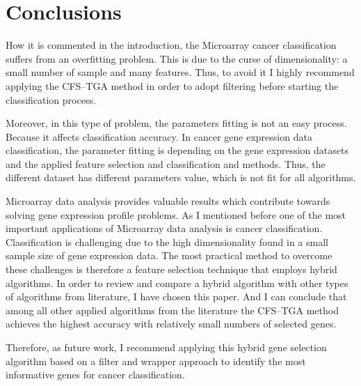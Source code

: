\documentclass[runningheads]{llncs}
\begin{document}
\section{Conclusions}
How it is commented in the introduction, the Microarray cancer classification suffers from an overfitting problem. This is due to the curse of dimensionality: a small number of sample and many features. Thus, to avoid it I highly recommend applying the CFS–TGA method in order to adopt filtering before starting the classification process.

Moreover, in this type of problem, the parameters fitting is not an easy process. Because it affects classification accuracy. In cancer gene expression data classification, the parameter fitting is depending on the gene expression datasets and the applied feature selection and classification and methods. Thus, the different dataset has different parameters value, which is not fit for all algorithms. 

Microarray data analysis provides valuable results which contribute towards solving gene expression profile problems. As I mentioned before one of the most important applications of Microarray data analysis is cancer classification. Classification is challenging due to the high dimensionality found in a small sample size of gene expression data. The most practical method to overcome these challenges is therefore a feature selection technique that employs hybrid algorithms. In order to review and compare a hybrid algorithm with other types of algorithms from literature, I have chosen this paper. And I can conclude that among all other applied algorithms from the literature the CFS–TGA method achieves the highest accuracy with relatively small numbers of selected genes.

Therefore, as future work, I recommend applying this hybrid gene selection algorithm based on a filter and wrapper approach to identify the most informative genes for cancer classification.
%
%
%


%
\end{document}
